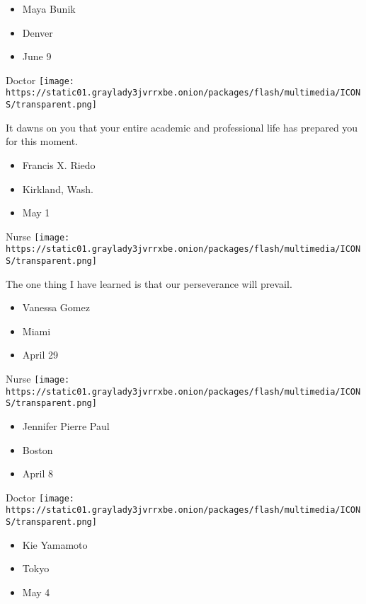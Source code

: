 \begin{itemize}
\tightlist
\item
  Maya Bunik
\item
  Denver
\item
  June 9
\end{itemize}

\protect\hyperlink{item-francis-x-riedo}{}

Doctor
\texttt{[image: https://static01.graylady3jvrrxbe.onion/packages/flash/multimedia/ICONS/transparent.png]}

It dawns on you that your entire academic and professional life has
prepared you for this moment.

\begin{itemize}
\tightlist
\item
  Francis X. Riedo
\item
  Kirkland, Wash.
\item
  May 1
\end{itemize}

\protect\hyperlink{item-vanessa-gomez}{}

Nurse
\texttt{[image: https://static01.graylady3jvrrxbe.onion/packages/flash/multimedia/ICONS/transparent.png]}

The one thing I have learned is that our perseverance will prevail.

\begin{itemize}
\tightlist
\item
  Vanessa Gomez
\item
  Miami
\item
  April 29
\end{itemize}

\protect\hyperlink{item-jennifer-pierre-paul}{}

Nurse
\texttt{[image: https://static01.graylady3jvrrxbe.onion/packages/flash/multimedia/ICONS/transparent.png]}

\begin{itemize}
\tightlist
\item
  Jennifer Pierre Paul
\item
  Boston
\item
  April 8
\end{itemize}

\protect\hyperlink{item-kie-yamamoto}{}

Doctor
\texttt{[image: https://static01.graylady3jvrrxbe.onion/packages/flash/multimedia/ICONS/transparent.png]}

\begin{itemize}
\tightlist
\item
  Kie Yamamoto
\item
  Tokyo
\item
  May 4
\end{itemize}

